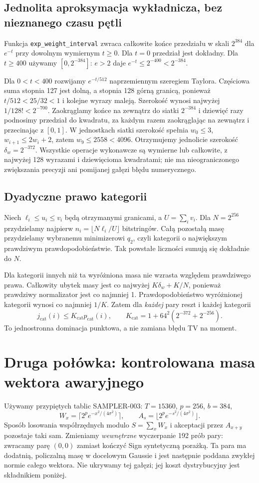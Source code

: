 \documentclass[11pt,a4paper]{article}
\newcommand{\code}[1]{\nolinkurl{#1}}
\begin{document}
\subsection*{Jednolita aproksymacja wykładnicza, bez nieznanego czasu pętli}
Funkcja \code{exp_weight_interval} zwraca całkowite końce przedziału
w skali $2^{384}$ dla $e^{-t}$ przy dowolnym wymiernym $t\ge0$.
Dla $t=0$ przedział jest dokładny. Dla $t\ge400$ używamy
$[0,2^{-384}]$: $e>2$ daje $e^{-t}\le2^{-400}<2^{-384}$.

Dla $0<t<400$ rozwijamy $e^{-t/512}$ naprzemiennym szeregiem Taylora.
Częściowa suma stopnia 127 jest dolną, a stopnia 128 górną granicą,
ponieważ $t/512<25/32<1$ i kolejne wyrazy maleją.
Szerokość wynosi najwyżej $1/128!<2^{-700}$.
Zaokrąglamy końce na zewnątrz do siatki $2^{-384}$ i dziewięć razy
podnosimy przedział do kwadratu, za każdym razem zaokrąglając na zewnątrz
i przecinając z $[0,1]$. W jednostkach siatki szerokość spełnia
$w_0\le3$, $w_{i+1}\le2w_i+2$, zatem $w_9\le2558<4096$.
Otrzymujemy jednolicie szerokość $\delta_w=2^{-372}$.
Wszystkie operacje wykonawcze są wymierne lub całkowite, z najwyżej
128 wyrazami i dziewięcioma kwadratami; nie ma nieograniczonego
zwiększania precyzji ani pomijanej gałęzi błędu numerycznego.

\subsection*{Dyadyczne prawo kategorii}
Niech $\ell_i\le u_i\le v_i$ będą otrzymanymi granicami, a $U=\sum_i v_i$.
Dla $N=2^{256}$ przydzielamy najpierw
$n_i=\lfloor N\ell_i/U\rfloor$ bitstringów.
Całą pozostałą masę przydzielamy wybranemu minimizerowi $q_2$,
czyli kategorii o największym prawdziwym prawdopodobieństwie.
Tak powstałe liczności sumują się dokładnie do $N$.

Dla kategorii innych niż ta wyróżniona masa nie wzrasta względem
prawdziwego prawa. Całkowity ubytek masy jest co najwyżej
$K\delta_w+K/N$, ponieważ prawdziwy normalizator jest co najmniej 1.
Prawdopodobieństwo wyróżnionej kategorii wynosi co najmniej $1/K$.
Zatem dla \emph{każdej} pary reszt i każdej kategorii
\[
 j_{\mathrm{cat}}(i)\le K_{\mathrm{cat}}p_{\mathrm{cat}}(i),\qquad
 K_{\mathrm{cat}}=1+64^2(2^{-372}+2^{-256}).
\]
To jednostronna dominacja punktowa, a nie zamiana błędu TV na moment.

\section{Druga połówka: kontrolowana masa wektora awaryjnego}
Używamy przypiętych tablic SAMPLER-003: $T=15360$, $p=256$, $b=384$,
\[
 W_x=\lceil2^p e^{-x^2/(4\sigma^2)}\rceil,\qquad
 A_s=\lfloor2^p e^{-s^2/(4\sigma^2)}\rfloor.
\]
Sposób losowania współrzędnych modulo $S=\sum_xW_x$ i akceptacji
przez $A_{x+y}$ pozostaje taki sam. Zmieniamy \emph{wewnętrzne}
wyczerpanie 192 prób pary: zwracamy parę $(0,0)$ zamiast kończyć Sign
syntetyczną porażką. Ta para ma dodatnią, policzalną masę w docelowym
Gaussie i jest następnie poddana zwykłej normie całego wektora.
Nie ukrywamy tej gałęzi; jej koszt dystrybucyjny jest składnikiem poniżej.
\end{document}
